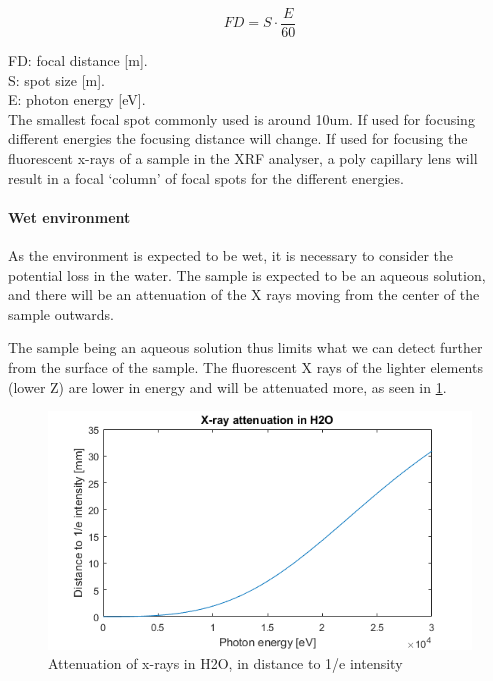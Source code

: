\begin{equation}
FD = S \cdot \frac{E}{60}
\end{equation}

\noindent FD: focal distance [m].\\
S: spot size [m].\\
E: photon energy [eV].\\

The smallest focal spot commonly used is around 10um.
If used for focusing different energies the focusing distance will change. If used for focusing the fluorescent x-rays of a sample in the XRF analyser, a poly capillary lens will result in a focal ‘column’ of focal spots for the different energies. 


\paragraph{Wet environment}
As the environment is expected to be wet, it is necessary to consider the potential loss in the water. The sample is expected to be an aqueous solution, and there will be an attenuation of the X rays moving from the center of the sample outwards. 

The sample being an aqueous solution thus limits what we can detect further from the surface of the sample. The fluorescent X rays of the lighter elements (lower Z)  are lower in energy and will be attenuated more, as seen in \ref{fig:AttnH2O}.

\begin{figure}[h]
	\centering
	\includegraphics[width=\textwidth]{figures/XRF/XrayAttnH2O.png}
	\caption{Attenuation of x-rays in H2O, in distance to 1/e intensity\citep{XRay_Attn_H2O}}
	\label{fig:AttnH2O}
\end{figure}


